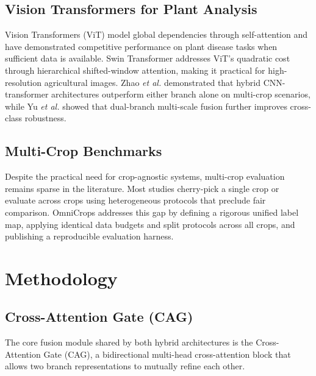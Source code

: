 \documentclass[conference]{IEEEtran}
\begin{document}
\subsection{Vision Transformers for Plant Analysis}
Vision Transformers (ViT) \cite{dosovitskiy2021} model global dependencies through self-attention and have demonstrated competitive performance on plant disease tasks when sufficient data is available. Swin Transformer \cite{swin2021} addresses ViT's quadratic cost through hierarchical shifted-window attention, making it practical for high-resolution agricultural images. Zhao \textit{et al.} \cite{zhao2024} demonstrated that hybrid CNN-transformer architectures outperform either branch alone on multi-crop scenarios, while Yu \textit{et al.} \cite{yu2023} showed that dual-branch multi-scale fusion further improves cross-class robustness.

\subsection{Multi-Crop Benchmarks}
Despite the practical need for crop-agnostic systems, multi-crop evaluation remains sparse in the literature. Most studies cherry-pick a single crop or evaluate across crops using heterogeneous protocols that preclude fair comparison. OmniCrops addresses this gap by defining a rigorous unified label map, applying identical data budgets and split protocols across all crops, and publishing a reproducible evaluation harness.

\section{Methodology}
\label{sec:method}

\subsection{Cross-Attention Gate (CAG)}
The core fusion module shared by both hybrid architectures is the Cross-Attention Gate (CAG), a bidirectional multi-head cross-attention block that allows two branch representations to mutually refine each other.
\end{document}
